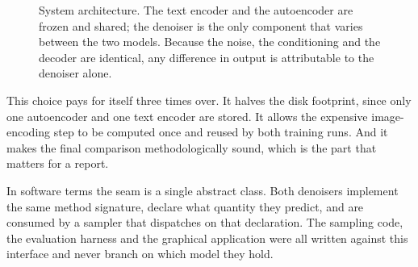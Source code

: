 \documentclass[11pt,a4paper]{article}
\begin{document}
\begin{figure}[htbp]
\centering
{}
\caption{System architecture. The text encoder and the autoencoder are frozen
and shared; the denoiser is the only component that varies between the two
models. Because the noise, the conditioning and the decoder are identical, any
difference in output is attributable to the denoiser alone.}
\label{fig:arch}
\end{figure}

This choice pays for itself three times over. It halves the disk footprint,
since only one autoencoder and one text encoder are stored. It allows the
expensive image-encoding step to be computed once and reused by both training
runs. And it makes the final comparison methodologically sound, which is the
part that matters for a report.

In software terms the seam is a single abstract class. Both denoisers implement
the same method signature, declare what quantity they predict, and are consumed
by a sampler that dispatches on that declaration. The sampling code, the
evaluation harness and the graphical application were all written against this
interface and never branch on which model they hold.
\end{document}

